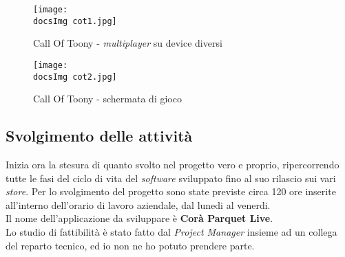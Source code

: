 \begin{figure}[H]
	\centering
	\texttt{[image: \\docsImg cot1.jpg]}
	\caption{Call Of Toony - \textit{multiplayer} su device diversi}
	\label{fig:Call Of Toony - multiplayer}
\end{figure}

\begin{figure}[H]
	\centering
	\texttt{[image: \\docsImg cot2.jpg]}
	\caption{Call Of Toony - schermata di gioco}
	\label{fig:Call Of Toony - schermata di gioco}
\end{figure}

\subsection{Svolgimento delle attivit\`a}
Inizia ora la stesura di quanto svolto nel progetto vero e proprio, ripercorrendo tutte le fasi del ciclo di vita del \textit{software\gloss} sviluppato fino al suo rilascio sui vari \textit{store}. Per lo svolgimento del progetto sono state previste circa 120 ore inserite all'interno dell'orario di lavoro aziendale, dal lunedi al venerdi.\\
Il nome dell'applicazione da sviluppare \`e \textbf{Cor\`a Parquet Live}.\\
Lo studio di fattibilit\`a \`e stato fatto dal \textit{Project Manager} insieme ad un collega del reparto tecnico, ed io non ne ho potuto prendere parte.


